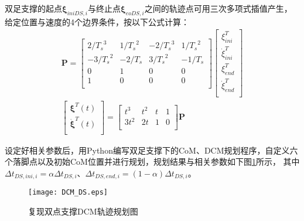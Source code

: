             双足支撑的起点$\boldsymbol{\xi}_{iniDS,i}$与终止点$\boldsymbol{\xi}_{eoDS,i}$之间的轨迹点可用三次多项式插值产生，给定位置与速度的4个边界条件，按以下公式计算：
            \begin{subequations}
                \begin{align}
                    \boldsymbol{P} = \left[
                    \begin{matrix}
                        2/{T_s}^3&		1/{T_s}^2&		-2/{T_s}^3&		1/{T_s}^2\\
                        -3/{T_s}^2&		-2/T_s&		3/{T_s}^2&		-1/T_s\\
                        0&		1&		0&		0\\
                        1&		0&		0&		0\\
                    \end{matrix} \right] \left[ 
                    \begin{array}{c}
                        \xi _{ini}^{T}\\
                        \dot{\xi}_{ini}^{T}\\
                        \xi _{end}^{T}\\
                        \dot{\xi}_{end}^{T}\\
                    \end{array} \right] 
                    \label{equ2-15a}\\
                    \left[ \begin{array}{c}
                        \boldsymbol{\xi }^T\left( t \right)\\
                        \boldsymbol{\dot{\xi}}^T\left( t \right)\\
                    \end{array} \right] =\left[ \begin{matrix}
                        t^3&		t^2&		t&		1\\
                        3t^2&		2t&		1&		0\\
                    \end{matrix} \right] \boldsymbol{P}
                    \label{equ2-15b}
                \end{align}
            \end{subequations}

            设定好相关参数后，用Python编写双足支撑下的CoM、DCM规划程序，自定义六个落脚点以及初始CoM位置并进行规划，规划结果与相关参数如下图\ref{fig2-6}所示，
            其中$\varDelta t_{DS,ini,i}=\alpha\varDelta t_{DS,i}$、$\varDelta t_{DS,end,i}=(1-\alpha)\varDelta t_{DS,i}$。
            \begin{figure}[ht] 
                \centering
                \texttt{[image: DCM\_DS.eps]}
                \caption{复现双点支撑DCM轨迹规划图} \label{fig2-6}
            \end{figure}
